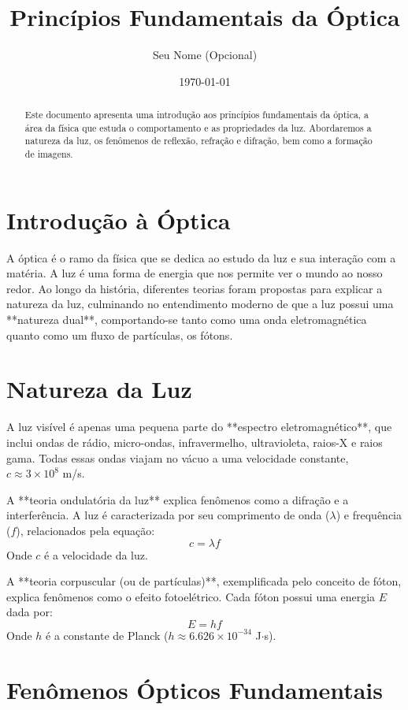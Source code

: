 \documentclass{article}
\title{Princípios Fundamentais da Óptica}
\author{Seu Nome (Opcional)}
\date{\today}
\begin{document}
\maketitle

\begin{abstract}
Este documento apresenta uma introdução aos princípios fundamentais da óptica, a área da física que estuda o comportamento e as propriedades da luz. Abordaremos a natureza da luz, os fenômenos de reflexão, refração e difração, bem como a formação de imagens.
\end{abstract}

\section{Introdução à Óptica}

A óptica é o ramo da física que se dedica ao estudo da luz e sua interação com a matéria. A luz é uma forma de energia que nos permite ver o mundo ao nosso redor. Ao longo da história, diferentes teorias foram propostas para explicar a natureza da luz, culminando no entendimento moderno de que a luz possui uma **natureza dual**, comportando-se tanto como uma onda eletromagnética quanto como um fluxo de partículas, os fótons.

\section{Natureza da Luz}

A luz visível é apenas uma pequena parte do **espectro eletromagnético**, que inclui ondas de rádio, micro-ondas, infravermelho, ultravioleta, raios-X e raios gama. Todas essas ondas viajam no vácuo a uma velocidade constante, $c \approx 3 \times 10^8$ m/s.

A **teoria ondulatória da luz** explica fenômenos como a difração e a interferência. A luz é caracterizada por seu comprimento de onda ($\lambda$) e frequência ($f$), relacionados pela equação:
$$c = \lambda f$$
Onde $c$ é a velocidade da luz.

A **teoria corpuscular (ou de partículas)**, exemplificada pelo conceito de fóton, explica fenômenos como o efeito fotoelétrico. Cada fóton possui uma energia $E$ dada por:
$$E = hf$$
Onde $h$ é a constante de Planck ($h \approx 6.626 \times 10^{-34}$ J$\cdot$s).

\section{Fenômenos Ópticos Fundamentais}
\end{document}
